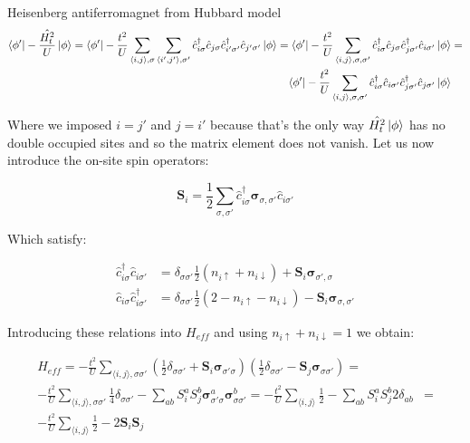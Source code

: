 \begin{section}{Heisenberg antiferromagnet from Hubbard model}
\begin{align*}
	\bra{\phi'} -\frac{\hat{H_t^2}}{U} \ket{\phi} =
	\bra{\phi'} -\frac{t^2}{U}\sum_{\langle i,j \rangle, \sigma} \sum_{\langle i',j' \rangle, \sigma'} \hat{c}_{i \sigma}^\dagger 			\hat{c}_{j \sigma} \hat{c}_{i' \sigma'}^\dagger \hat{c}_{j' \sigma'} \ket{\phi} =
	\bra{\phi'} -\frac{t^2}{U}\sum_{\langle i,j \rangle, \sigma, \sigma'} \hat{c}_{i \sigma}^\dagger \hat{c}_{j \sigma} \hat{c}_{j \sigma'}^\dagger \hat{c}_{i \sigma'} \ket{\phi} &= \\
	\bra{\phi'} -\frac{t^2}{U}\sum_{\langle i,j \rangle, \sigma, \sigma'} \hat{c}_{i \sigma}^\dagger \hat{c}_{i \sigma'} \hat{c}_{j \sigma'}^\dagger \hat{c}_{j \sigma'} \ket{\phi} &
\end{align*}

Where we imposed $i=j'$ and $j=i'$ because that's the only way $\hat{H_t^2}\ket{\phi}$ has no double occupied sites and so the matrix element does not vanish. Let us now introduce the on-site spin operators:

\begin{equation}
\boldsymbol{S}_i = \frac{1}{2} \sum_{\sigma, \sigma'} \hat{c}_{i \sigma}^\dagger \boldsymbol{\sigma}_{\sigma, \sigma'} \hat{c}_{i \sigma'}
\end{equation}

Which satisfy:

\begin{align*}
\hat{c}_{i \sigma}^\dagger \hat{c}_{i \sigma'} &= \delta_{\sigma \sigma'} \frac{1}{2} (n_{i \uparrow} + n_{i \downarrow}) + \boldsymbol{S}_i\boldsymbol{\sigma}_{\sigma', \sigma} \\ 
\hat{c}_{i \sigma} \hat{c}_{i \sigma'}^\dagger &= \delta_{\sigma \sigma'} \frac{1}{2} (2 - n_{i \uparrow} - n_{i \downarrow}) - \boldsymbol{S}_i\boldsymbol{\sigma}_{\sigma, \sigma'} 
\end{align*}

Introducing these relations into $H_{eff}$ and using $n_{i \uparrow} + n_{i \downarrow} = 1$ we obtain:

\begin{align*}
H_{eff} = -\frac{t^2}{U} \sum_{\langle i,j \rangle, \sigma \sigma'} \left(\frac{1}{2}\delta_{\sigma \sigma'} + \boldsymbol{S}_i				\boldsymbol{\sigma}_{\sigma' \sigma}\right)\left(\frac{1}{2}\delta_{\sigma \sigma'}-\boldsymbol{S}_j\boldsymbol{\sigma}				_{\sigma \sigma'}\right) = \\
-\frac{t^2}{U}\sum_{\langle i,j \rangle, \sigma \sigma'} \frac{1}{4}\delta_{\sigma \sigma'} - \sum_{ab} S_i^aS_j^b 							\boldsymbol{\sigma}_{\sigma'\sigma}^a \boldsymbol{\sigma}_{\sigma \sigma'}^b = 
-\frac{t^2}{U}\sum_{\langle i,j \rangle} \frac{1}{2} - \sum_{ab} S_i^aS_j^b	2\delta_{ab} &= \\
-\frac{t^2}{U}\sum_{\langle i,j \rangle} \frac{1}{2} - 2\boldsymbol{S}_i\boldsymbol{S}_j
\end{align*}


\end{section}
